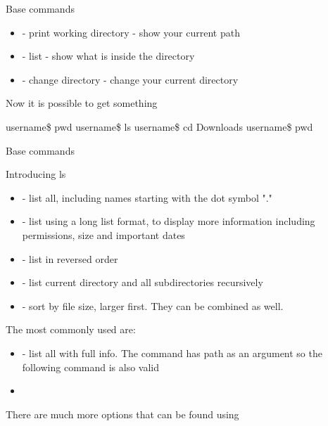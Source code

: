 \documentclass[usenames,dvipsnames,10pt,aspectratio=169]{beamer}
\begin{document}
\begin{frame}{Base commands}
\begin{itemize}
    \item {} - print working directory - show your current path
    \item {} - list - show what is inside the directory
    \item {} - change directory - change your current directory
\end{itemize}
Now it is possible to get something 
\begin{examples}
    username\$ pwd \newline
     \newline
    username\$ ls \newline
     \newline
    username\$ cd Downloads \newline
    username\$ pwd \newline
\end{examples}
\end{frame}
\begin{frame}{Base commands}

{\Large{Introducing ls}} \newline
\begin{itemize}
    \item {} - list all, including names starting with the dot symbol "."
    \item {} - list using a long list format, to display more information including permissions, size and important dates
    \item {} - list in reversed order
    \item {} - list current directory and all subdirectories recursively
    \item {} - sort by file size, larger first. They can be combined as well.
\end{itemize}
The most commonly used are:
\begin{itemize}
    \item {} - list all with full info. The command has path as an argument so the following command is also valid
    \item {}
\end{itemize}
There are much more options that can be found using 
\end{frame}
\end{document}
